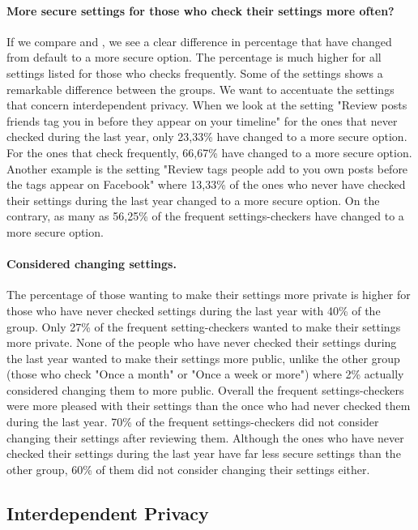 \paragraph{More secure settings for those who check their settings more often?}
If we compare  and , we see a clear difference in percentage that have changed from default to a more secure option. The percentage is much higher for all settings listed for those who checks frequently. Some of the settings shows a remarkable difference between the groups. We want to accentuate the settings that concern interdependent privacy. When we look at the setting "Review posts friends tag you in before they appear on your timeline" for the ones that never checked during the last year, only 23,33\% have changed to a more secure option. For the ones that check frequently, 66,67\% have changed to a more secure option. Another example is the setting "Review tags people add to you own posts before the tags appear on Facebook" where 13,33\% of the ones who never have checked their settings during the last year changed to a more secure option. On the contrary, as many as 56,25\% of the frequent settings-checkers have changed to a more secure option.

\paragraph{Considered changing settings.}
The percentage of those wanting to make their settings more private is higher for those who have never checked settings during the last year with 40\% of the group. Only 27\% of the frequent setting-checkers wanted to make their settings more private. 
None of the people who have never checked their settings during the last year wanted to make their settings more public, unlike the other group (those who check "Once a month" or "Once a week or more") where 2\% actually considered changing them to more public. Overall the frequent settings-checkers were more pleased with their settings than the once who had never checked them during the last year. 70\% of the frequent settings-checkers did not consider changing their settings after reviewing them. Although the ones who have never checked their settings during the last year have far less secure settings than the other group, 60\% of them did not consider changing their settings either. 


\subsection{Interdependent Privacy}


